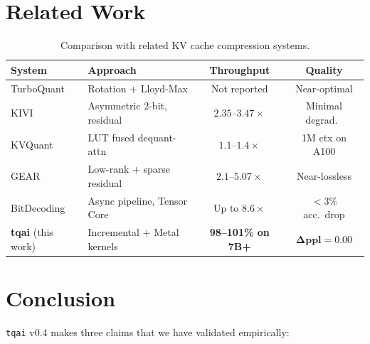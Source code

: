\documentclass[11pt,a4paper]{article}
\begin{document}
\section{Related Work}

\begin{table}[h]
\centering
\caption{Comparison with related KV cache compression systems.}
\label{tab:related-work}
\begin{tabular}{llcc}
\toprule
\textbf{System} & \textbf{Approach} & \textbf{Throughput} & \textbf{Quality} \\
\midrule
TurboQuant~\cite{zandieh2026turboquant} & Rotation + Lloyd-Max & Not reported & Near-optimal \\
KIVI~\cite{yuan2024kivi}       & Asymmetric 2-bit, residual & $2.35$--$3.47\times$ & Minimal degrad.\ \\
KVQuant~\cite{hooper2024kvquant}    & LUT fused dequant-attn & $1.1$--$1.4\times$ & 1M ctx on A100 \\
GEAR~\cite{kang2024gear}        & Low-rank + sparse residual & $2.1$--$5.07\times$ & Near-lossless \\
BitDecoding~\cite{bitdecoding2025}  & Async pipeline, Tensor Core & Up to $8.6\times$ & $<3\%$ acc.\ drop \\
\textbf{tqai} (this work) & Incremental + Metal kernels & \textbf{98--101\% on 7B+} & $\boldsymbol{\Delta}\textbf{ppl} = \mathbf{0.00}$ \\
\bottomrule
\end{tabular}
\end{table}

\section{Conclusion}

\texttt{tqai} v0.4 makes three claims that we have validated empirically:
\end{document}
